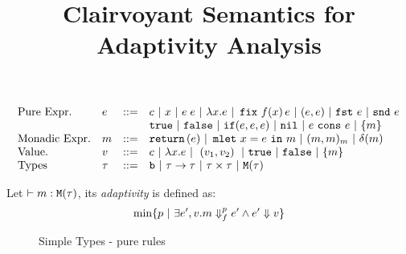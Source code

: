 \documentclass[a4paper,11pt]{article}
\title{Clairvoyant Semantics for Adaptivity Analysis}
\author{}
\date{}
\theoremstyle{definition}
\begin{document}
\maketitle



\[\begin{array}{llll}
    \mbox{Pure Expr.} & e & ::= & c ~|~ x ~|~ e \; e 
                                      ~|~ \lambda x. e  ~|~ \mathop{\mathtt{fix}}
                                      \, f(x) \, e ~|~
                                      ( e,e) ~|~
                                      \mathtt{fst}\,\, e ~|~ \mathtt{snd}\,\, e\\ 
                      & & &  \mathtt{true} ~|~ \mathtt{false} ~|~ \mathtt{if} (e, e
                            , e)  ~|~ \mathtt{nil} ~|~ e \,  \mathop{\mathtt{cons}}
                            \, e ~|~  \{m\} \\
    \mbox{Monadic Expr.} & m & ::= & \mathtt{return} \,(e) ~|~
                                          \mathop{\mathtt{mlet}}\, x=e\, \mathop{\mathtt{in}}\, m ~|~
                                         ( m, m )_m ~|~ \delta(m)\\
    \mbox{Value.} & v & ::= & c ~|~ \lambda x. e ~|~ \mathrel{ ( v_1 , v_2 ) } ~|~  \mathtt{true} ~|~ \mathtt{false}  ~|~ \{m\}\\
    \mbox{Types} & \tau &::=  &  \mathtt{b} ~|~ \tau \to \tau ~|~ \tau
                                 \times \tau
                                 ~|~ \mathtt{M}(\tau)  \\
  \end{array}\]



\begin{definition}
  Let $\vdash m : \mathtt{M}(\tau)$, its \emph{adaptivity} is defined as:
  $$
  \min\{p ~|~ \exists e',v. m\mathrel{\Downarrow_f^{p}} e' \land e' \mathrel{\Downarrow} v \}
  $$
\end{definition}


\begin{figure}[h]
  \caption{Simple Types - pure rules}
  \label{fig:simple-types-pure}
\end{figure}
\end{document}
